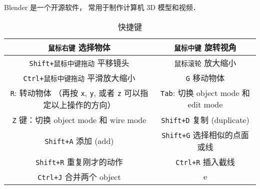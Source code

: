
\begin{issues}
\issueDraft
\end{issues}

Blender 是一个开源软件， 常用于制作计算机 3D 模型和视频．

\begin{table}[ht]
\centering
\caption{快捷键}\label{Blendr_tab1}
\begin{tabular}{|c|c|}
\hline
\verb|鼠标右键| 选择物体 & \verb|鼠标中键| 旋转视角 \\
\hline
\verb|Shift+鼠标中键拖动| 平移镜头 & \verb|鼠标滚轮| 放大缩小 \\
\hline
\verb|Ctrl+鼠标中键拖动| 平滑放大缩小 & \verb|G| 移动物体 \\
\hline
\verb|R|: 转动物体 （再按 \verb|x|, \verb|y|, 或者 \verb|z| 可以指定以上操作的方向） & \verb|Tab|: 切换 object mode 和 edit mode \\
\hline
\verb|Z| 键：切换 object mode 和 wire mode & \verb|Shift+D| 复制 (duplicate) \\
\hline
\verb|Shift+A| 添加 (add) & \verb|Shift+G| 选择相似的点面或线 \\
\hline
\verb|Shift+R| 重复刚才的动作 & \verb|Ctrl+R| 插入截线 \\
\hline
\verb|Ctrl+J| 合并两个 object & e\\
\hline
\end{tabular}
\end{table}
